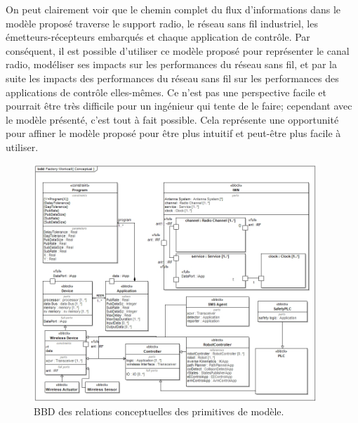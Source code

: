 \documentclass[12pt]{article}
\begin{document}

On peut clairement voir que le chemin complet du flux d'informations dans le modèle proposé traverse le support radio, le réseau sans fil industriel, les émetteurs-récepteurs embarqués et chaque application de contrôle. Par conséquent, il est possible d'utiliser ce modèle proposé pour représenter le canal radio, modéliser ses impacts sur les performances du réseau sans fil, et par la suite les impacts des performances du réseau sans fil sur les performances des applications de contrôle elles-mêmes. Ce n'est pas une perspective facile et pourrait être très difficile pour un ingénieur qui tente de le faire; cependant avec le modèle présenté, c'est tout à fait possible. Cela représente une opportunité pour affiner le modèle proposé pour être plus intuitif et peut-être plus facile à utiliser.  

\begin{figure}[!th]
	\centering
	\includegraphics[width=0.95\textwidth]{../chapter-conclusions/images/Conceptual}
	\caption{BBD des relations conceptuelles des primitives de modèle.}
	\label{fig:concl:conceptual}
\end{figure}
\end{document}
